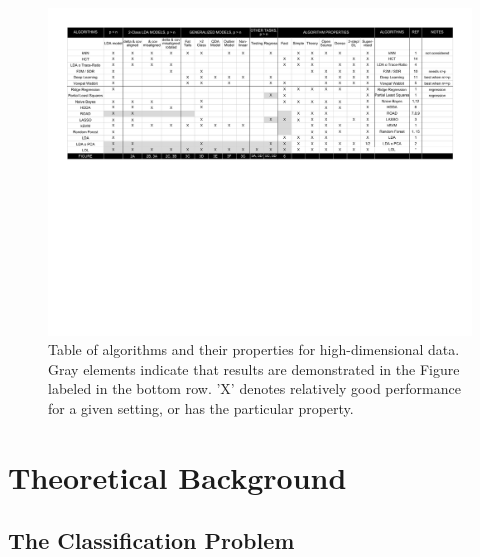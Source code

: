 \documentclass[10pt]{article}
\begin{document}
\begin{figure}
\centering
\includegraphics[width=1\linewidth,trim=0.5in 4.5in 0.5in 0.5in,clip=true]{../Figs/table} %
\caption{Table of algorithms and their properties for high-dimensional data. Gray elements indicate that results are demonstrated in the Figure labeled in the bottom row. 'X' denotes relatively good performance for a given setting, or has the particular property.
}
\label{f:table}
\end{figure}



\clearpage





\section[theory]{Theoretical Background}


\subsection{The Classification Problem}
\end{document}
